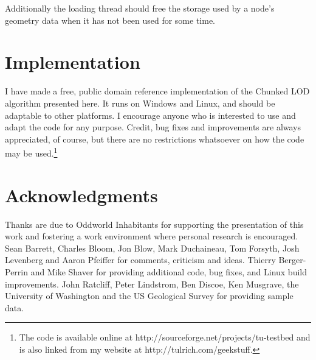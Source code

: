 \documentclass[12pt]{article}
\begin{document}
Additionally the loading thread should free the storage used by a
node's geometry data when it has not been used for some time.
 
\section{Implementation}




I have made a free, public domain reference implementation of the
Chunked LOD algorithm presented here.  It runs on Windows and Linux,
and should be adaptable to other platforms.  I encourage anyone who is
interested to use and adapt the code for any purpose.  Credit, bug
fixes and improvements are always appreciated, of course, but there
are no restrictions whatsoever on how the code may be
used.\footnote{The code is available online at
http://sourceforge.net/projects/tu-testbed and is also linked from my
website at http://tulrich.com/geekstuff.}
 
\section{Acknowledgments}

Thanks are due to Oddworld Inhabitants for supporting the presentation
of this work and fostering a work environment where personal research
is encouraged.  Sean Barrett, Charles Bloom, Jon Blow, Mark
Duchaineau, Tom Forsyth, Josh Levenberg and Aaron Pfeiffer for
comments, criticism and ideas.  Thierry Berger-Perrin and Mike Shaver
for providing additional code, bug fixes, and Linux build
improvements.  John Ratcliff, Peter Lindstrom, Ben Discoe, Ken
Musgrave, the University of Washington and the US Geological Survey
for providing sample data.
 


\end{document}
